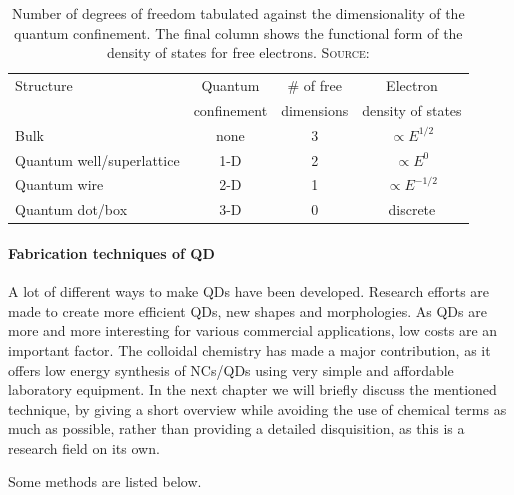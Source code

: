		\begin{table}[htbp]
		\centering
			\begin{tabular}{lccc}
				Structure											&	Quantum	\index{Confinement!Quantum}			&	\# of free		&	Electron						\\
																			&	confinement		&	dimensions		&	density of states\index{Density of States}		\\
				\hline
				Bulk													&	none					&	3							&	$\propto E^{1/2}$		\\
				Quantum well/superlattice			&	1-D						&	2							&	$\propto E^{0}$			\\
				Quantum wire									&	2-D						&	1							&	$\propto E^{-1/2}$	\\
				Quantum dot/box								&	3-D						&	0							&	discrete						\\
			\end{tabular}
			\caption{Number of degrees of freedom tabulated against the dimensionality of the quantum confinement.
							 The final column shows the functional form of the density of states for free electrons.
							 {\scshape Source:} \cite[p.142]{Fox}}
			\label{tbl:ConfinedStr}
		\end{table}
	
	\paragraph{Fabrication techniques of \gls{QD}}
	
		A lot of different ways to make \glspl{QD} have been developed. Research efforts are made to create
		more efficient \glspl{QD}, new shapes and morphologies. As \glspl{QD} are more and more interesting for various commercial applications,
		low costs are an important factor. The colloidal chemistry has made a major contribution, as it offers low energy
		synthesis of \glspl{NC}/\glspl{QD} using very simple and affordable laboratory equipment.		
		In the next chapter we will briefly discuss the mentioned technique, by giving a short overview
		while avoiding the use of chemical terms as much as possible, rather than providing a detailed disquisition, as this is a research field on its own.
		
		Some methods are listed below.
	
